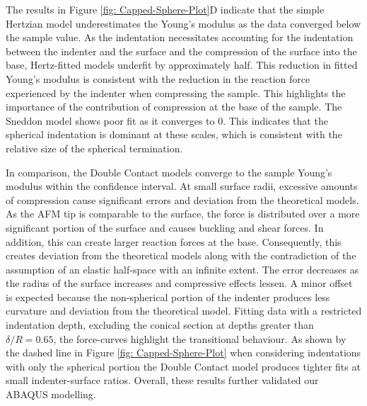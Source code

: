 The results in Figure \ref{fig: Capped-Sphere-Plot}D indicate that the simple Hertzian model underestimates the Young's modulus as the data converged below the sample value. As the indentation necessitates accounting for the indentation between the indenter and the surface and the compression of the surface into the base, Hertz-fitted models underfit by approximately half. This reduction in fitted Young's modulus is consistent with the reduction in the reaction force experienced by the indenter when compressing the sample. This highlights the importance of the contribution of compression at the base of the sample. The Sneddon model shows poor fit as it converges to 0. This indicates that the spherical indentation is dominant at these scales, which is consistent with the relative size of the spherical termination. 

In comparison, the Double Contact models converge to the sample Young's modulus within the confidence interval. At small surface radii, excessive amounts of compression cause significant errors and deviation from the theoretical models. As the AFM tip is comparable to the surface, the force is distributed over a more significant portion of the surface and causes buckling and shear forces. In addition, this can create larger reaction forces at the base. Consequently, this creates deviation from the theoretical models along with the contradiction of the assumption of an elastic half-space with an infinite extent. The error decreases as the radius of the surface increases and compressive effects lessen. A minor offset is expected because the non-spherical portion of the indenter produces less curvature and deviation from the theoretical model. Fitting data with a restricted indentation depth, excluding the conical section at depths greater than $\delta/R=0.65$, the force-curves highlight the transitional behaviour. As shown by the dashed line in Figure \ref{fig: Capped-Sphere-Plot} when considering indentations with only the spherical portion the Double Contact model produces tighter fits at small indenter-surface ratios. Overall, these results further validated our ABAQUS modelling.
